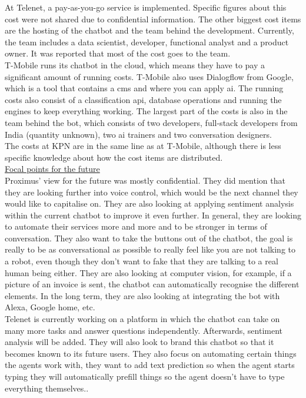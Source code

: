 \break
At Telenet, a pay-as-you-go service is implemented. Specific figures about this cost were not shared due to confidential information. The other biggest cost items are the hosting of the chatbot and the team behind the development. Currently, the team includes a data scientist, developer, functional analyst and a product owner. It was reported that most of the cost goes to the team.\\
\break
T-Mobile runs its chatbot in the cloud, which means they have to pay a significant amount of running costs. T-Mobile also uses Dialogflow from Google, which is a tool that contains a \acrshort{cms} and where you can apply \acrshort{ai}. The running costs also consist of a classification \acrshort{api}, database operations and running the engines to keep everything working. The largest part of the costs is also in the team behind the bot, which consists of two developers, full-stack developers from India (quantity unknown), two \acrshort{ai} trainers and two conversation designers.\\
\break
The costs at KPN are in the same line as at T-Mobile, although there is less specific knowledge about how the cost items are distributed.\\
\break
{}
\ul{Focal points for the future}\\
Proximus' view for the future was mostly confidential. They did mention that they are looking further into voice control, which would be the next channel they would like to capitalise on. They are also looking at applying sentiment analysis within the current chatbot to improve it even further. In general, they are looking to automate their services more and more and to be stronger in terms of conversation. They also want to take the buttons out of the chatbot, the goal is really to be as conversational as possible to really feel like you are not talking to a robot, even though they don't want to fake that they are talking to a real human being either. They are also looking at computer vision, for example, if a picture of an invoice is sent, the chatbot can automatically recognise the different elements. In the long term, they are also looking at integrating the bot with Alexa, Google home, etc.\\
\break
Telenet is currently working on a platform in which the chatbot can take on many more tasks and answer questions independently. Afterwards, sentiment analysis will be added. They will also look to brand this chatbot so that it becomes known to its future users. They also focus on automating certain things the agents work with, they want to add text prediction so when the agent starts typing they will automatically prefill things so the agent doesn't have to type everything themselves..\\
